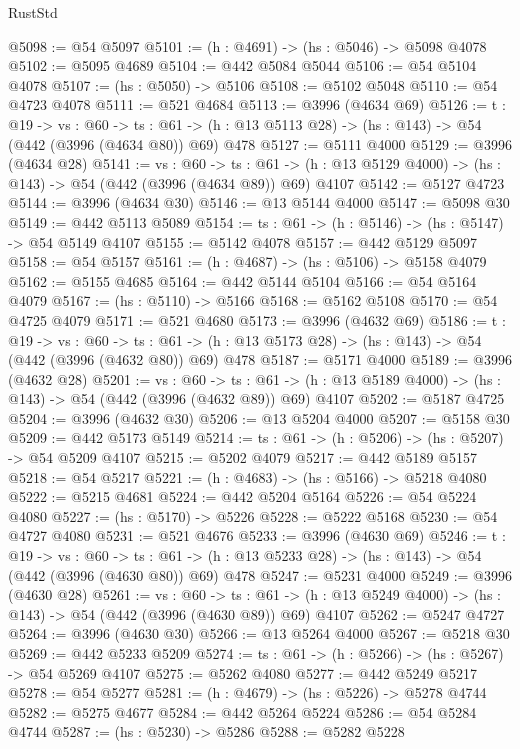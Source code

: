 \begin{lexlean}{RustStd}
\begin{coremodule}
@5098 := @54 @5097
@5101 := (h : @4691) -> (hs : @5046) -> @5098 @4078
@5102 := @5095 @4689
@5104 := @442 @5084 @5044
@5106 := @54 @5104 @4078
@5107 := (hs : @5050) -> @5106
@5108 := @5102 @5048
@5110 := @54 @4723 @4078
@5111 := @521 @4684
@5113 := @3996 (@4634 @69)
@5126 := {t : @19} ->
  {vs : @60} ->
  {ts : @61} -> (h : @13 @5113 @28) -> (hs : @143) -> @54 (@442 (@3996 (@4634 @80)) @69) @478
@5127 := @5111 @4000
@5129 := @3996 (@4634 @28)
@5141 := {vs : @60} ->
  {ts : @61} -> (h : @13 @5129 @4000) -> (hs : @143) -> @54 (@442 (@3996 (@4634 @89)) @69) @4107
@5142 := @5127 @4723
@5144 := @3996 (@4634 @30)
@5146 := @13 @5144 @4000
@5147 := @5098 @30
@5149 := @442 @5113 @5089
@5154 := {ts : @61} -> (h : @5146) -> (hs : @5147) -> @54 @5149 @4107
@5155 := @5142 @4078
@5157 := @442 @5129 @5097
@5158 := @54 @5157
@5161 := (h : @4687) -> (hs : @5106) -> @5158 @4079
@5162 := @5155 @4685
@5164 := @442 @5144 @5104
@5166 := @54 @5164 @4079
@5167 := (hs : @5110) -> @5166
@5168 := @5162 @5108
@5170 := @54 @4725 @4079
@5171 := @521 @4680
@5173 := @3996 (@4632 @69)
@5186 := {t : @19} ->
  {vs : @60} ->
  {ts : @61} -> (h : @13 @5173 @28) -> (hs : @143) -> @54 (@442 (@3996 (@4632 @80)) @69) @478
@5187 := @5171 @4000
@5189 := @3996 (@4632 @28)
@5201 := {vs : @60} ->
  {ts : @61} -> (h : @13 @5189 @4000) -> (hs : @143) -> @54 (@442 (@3996 (@4632 @89)) @69) @4107
@5202 := @5187 @4725
@5204 := @3996 (@4632 @30)
@5206 := @13 @5204 @4000
@5207 := @5158 @30
@5209 := @442 @5173 @5149
@5214 := {ts : @61} -> (h : @5206) -> (hs : @5207) -> @54 @5209 @4107
@5215 := @5202 @4079
@5217 := @442 @5189 @5157
@5218 := @54 @5217
@5221 := (h : @4683) -> (hs : @5166) -> @5218 @4080
@5222 := @5215 @4681
@5224 := @442 @5204 @5164
@5226 := @54 @5224 @4080
@5227 := (hs : @5170) -> @5226
@5228 := @5222 @5168
@5230 := @54 @4727 @4080
@5231 := @521 @4676
@5233 := @3996 (@4630 @69)
@5246 := {t : @19} ->
  {vs : @60} ->
  {ts : @61} -> (h : @13 @5233 @28) -> (hs : @143) -> @54 (@442 (@3996 (@4630 @80)) @69) @478
@5247 := @5231 @4000
@5249 := @3996 (@4630 @28)
@5261 := {vs : @60} ->
  {ts : @61} -> (h : @13 @5249 @4000) -> (hs : @143) -> @54 (@442 (@3996 (@4630 @89)) @69) @4107
@5262 := @5247 @4727
@5264 := @3996 (@4630 @30)
@5266 := @13 @5264 @4000
@5267 := @5218 @30
@5269 := @442 @5233 @5209
@5274 := {ts : @61} -> (h : @5266) -> (hs : @5267) -> @54 @5269 @4107
@5275 := @5262 @4080
@5277 := @442 @5249 @5217
@5278 := @54 @5277
@5281 := (h : @4679) -> (hs : @5226) -> @5278 @4744
@5282 := @5275 @4677
@5284 := @442 @5264 @5224
@5286 := @54 @5284 @4744
@5287 := (hs : @5230) -> @5286
@5288 := @5282 @5228

\end{coremodule}
\end{lexlean}
